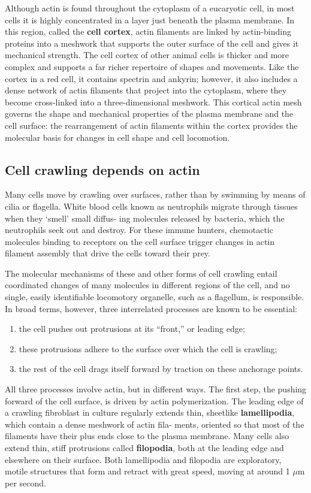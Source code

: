 Although actin is found throughout the cytoplasm of a eucaryotic cell,
in most cells it is highly concentrated in a layer just beneath the plasma
membrane. In this region, called the \textbf{cell cortex}, actin filaments are
linked by actin-binding proteins into a meshwork that supports the outer
surface of the cell and gives it mechanical strength. The cell cortex of
other animal cells is thicker and more complex and supports
a far richer repertoire of shapes and movements. Like the cortex in a red
cell, it contains spectrin and ankyrin; however, it also includes a dense
network of actin filaments that project into the cytoplasm, where they
become cross-linked into a three-dimensional meshwork. This cortical
actin mesh governs the shape and mechanical properties of the plasma
membrane and the cell surface: the rearrangement of actin filaments
within the cortex provides the molecular basis for changes in cell shape
and cell locomotion.

\subsection{Cell crawling depends on actin}

Many cells move by crawling over surfaces, rather than by swimming
by means of cilia or flagella. White blood cells known
as neutrophils migrate through tissues when they ‘smell’ small diffus-
ing molecules released by bacteria, which the neutrophils seek out and
destroy. For these immune hunters, chemotactic molecules binding to
receptors on the cell surface trigger changes in actin filament assembly
that drive the cells toward their prey.

The molecular mechanisms of these and other forms of cell crawling
entail coordinated changes of many molecules in different regions of
the cell, and no single, easily identifiable locomotory organelle, such as
a flagellum, is responsible. In broad terms, however, three interrelated
processes are known to be essential:

\begin{enumerate}
\item the cell pushes out protrusions at its “front,” or leading edge;
\item these protrusions adhere to the surface over which the cell is crawling;
\item the rest of the cell drags itself forward by traction on these anchorage points.
\end{enumerate}

All three processes involve actin, but in different ways. The first step, the
pushing forward of the cell surface, is driven by actin polymerization. The
leading edge of a crawling fibroblast in culture regularly extends thin,
sheetlike \textbf{lamellipodia}, which contain a dense meshwork of actin fila-
ments, oriented so that most of the filaments have their plus ends close
to the plasma membrane. Many cells also extend thin, stiff
protrusions called \textbf{filopodia}, both at the leading edge and elsewhere on
their surface. Both lamellipodia and filopodia are exploratory, motile structures
that form and retract with great speed, moving at around 1 $\mu$m per
second.

